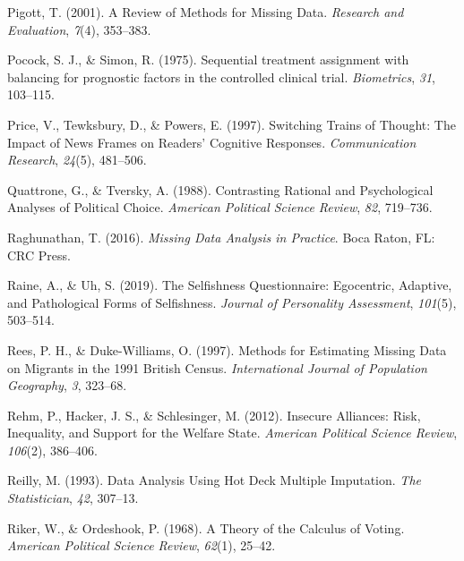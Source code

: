 \documentclass[12pt,econ]{sources/authesis}
\newenvironment{CSLReferences}%
  {}%
  {\par}
\begin{document}
\begin{CSLReferences}{1}{0}
\leavevmode{}%
Pigott, T. (2001). A {Review} of {Methods} for {Missing} {Data}. \emph{Research and Evaluation}, \emph{7}(4), 353--383.

\leavevmode{}%
Pocock, S. J., \& Simon, R. (1975). Sequential treatment assignment with balancing for prognostic factors in the controlled clinical trial. \emph{Biometrics}, \emph{31}, 103--115.

\leavevmode{}%
Price, V., Tewksbury, D., \& Powers, E. (1997). Switching {Trains} of {Thought}: {The} {Impact} of {News} {Frames} on {Readers}' {Cognitive} {Responses}. \emph{Communication Research}, \emph{24}(5), 481--506.

\leavevmode{}%
Quattrone, G., \& Tversky, A. (1988). {Contrasting Rational and Psychological Analyses of Political Choice}. \emph{American Political Science Review}, \emph{82}, 719--736.

\leavevmode{}%
Raghunathan, T. (2016). \emph{{Missing Data Analysis in Practice}}. Boca Raton, FL: CRC Press.

\leavevmode{}%
Raine, A., \& Uh, S. (2019). {The Selfishness Questionnaire: Egocentric, Adaptive, and Pathological Forms of Selfishness}. \emph{Journal of Personality Assessment}, \emph{101}(5), 503--514.

\leavevmode{}%
Rees, P. H., \& Duke-Williams, O. (1997). {Methods for Estimating Missing Data on Migrants in the 1991 British Census}. \emph{International Journal of Population Geography}, \emph{3}, 323--68.

\leavevmode{}%
Rehm, P., Hacker, J. S., \& Schlesinger, M. (2012). {Insecure Alliances: Risk, Inequality, and Support for the Welfare State}. \emph{American Political Science Review}, \emph{106}(2), 386--406.

\leavevmode{}%
Reilly, M. (1993). {Data Analysis Using Hot Deck Multiple Imputation}. \emph{The Statistician}, \emph{42}, 307--13.

\leavevmode{}%
Riker, W., \& Ordeshook, P. (1968). A {Theory} of the {Calculus} of {Voting}. \emph{American Political Science Review}, \emph{62}(1), 25--42.


\end{CSLReferences}
\end{document}

